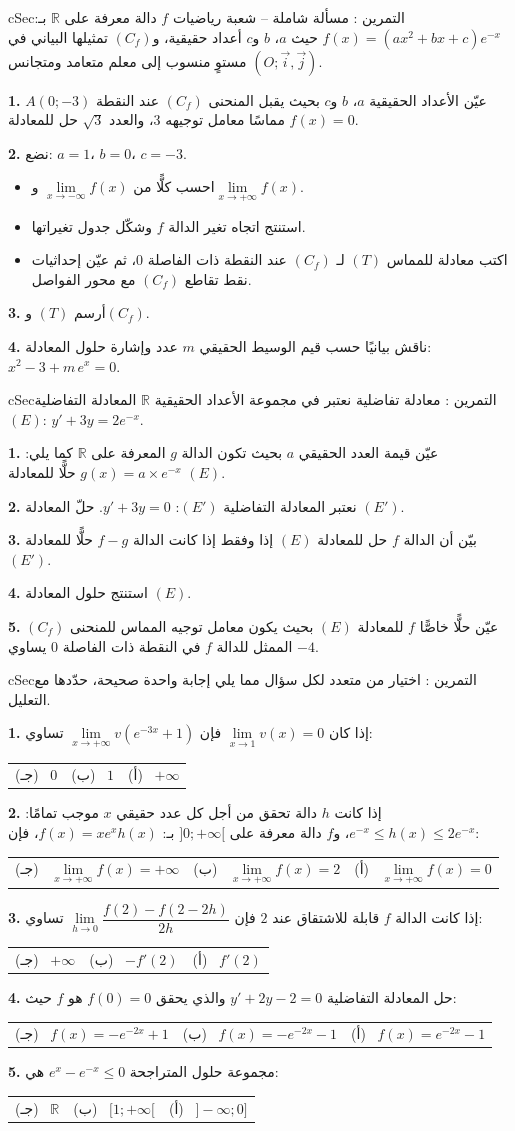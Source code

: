 \documentclass[12pt,a4paper]{article}
\newenvironment{BOX}[2]{\begin{otherlanguage}{english}\begin{arbox}{#1}{#2}}{\end{arbox}\end{otherlanguage}}
\newcounter{exo}
\newenvironment{tamrin}[1]{\stepcounter{exo}\begin{BOX}{cSec}{التمرين \theexo: #1}}{\end{BOX}}
\newcommand{\R}{\mathbb{R}}
\newenvironment{sq}{\begin{itemize}[leftmargin=2.4em,itemsep=3pt]}{\end{itemize}}
\newcommand{\qa}{\item[(أ)]}\newcommand{\qb}{\item[(ب)]}\newcommand{\qc}{\item[(جـ)]}\newcommand{\qd}{\item[(د)]}\newcommand{\qe}{\item[(هـ)]}
\newcommand{\QQ}[1]{\par\smallskip\textbf{#1.} }
\newcommand{\ABC}[3]{\\[2pt]\begin{tabular}{p{0.28\textwidth}p{0.28\textwidth}p{0.28\textwidth}}(جـ) \ #3 & (ب) \ #2 & (أ) \ #1\end{tabular}}
\begin{document}
\begin{tamrin}{مسألة شاملة -- شعبة رياضيات}
$f$ دالة معرفة على $\R$ بـ: $f(x)=\left(ax^2+bx+c\right)e^{-x}$ حيث $a$، $b$ و$c$ أعداد حقيقية، و$(C_f)$ تمثيلها البياني في مستوٍ منسوب إلى معلم متعامد ومتجانس $(O;\vec i,\vec j)$.
\QQ{1} عيّن الأعداد الحقيقية $a$، $b$ و$c$ بحيث يقبل المنحنى $(C_f)$ عند النقطة $A(0;-3)$ مماسًا معامل توجيهه $3$، والعدد $\sqrt3$ حل للمعادلة $f(x)=0$.
\QQ{2} نضع: $a=1$، $b=0$، $c=-3$.
\begin{sq}
\qa احسب كلًّا من $\lim\limits_{x\to-\infty}f(x)$ و$\lim\limits_{x\to+\infty}f(x)$.
\qb استنتج اتجاه تغير الدالة $f$ وشكّل جدول تغيراتها.
\qc اكتب معادلة للمماس $(T)$ لـ $(C_f)$ عند النقطة ذات الفاصلة $0$، ثم عيّن إحداثيات نقط تقاطع $(C_f)$ مع محور الفواصل.
\end{sq}
\QQ{3} أرسم $(T)$ و$(C_f)$.
\QQ{4} ناقش بيانيًا حسب قيم الوسيط الحقيقي $m$ عدد وإشارة حلول المعادلة: $x^2-3+m\,e^{x}=0$.
\end{tamrin}

\begin{tamrin}{معادلة تفاضلية}
نعتبر في مجموعة الأعداد الحقيقية $\R$ المعادلة التفاضلية $(E)$: $y'+3y=2e^{-x}$.
\QQ{1} عيّن قيمة العدد الحقيقي $a$ بحيث تكون الدالة $g$ المعرفة على $\R$ كما يلي: $g(x)=a\times e^{-x}$ حلًّا للمعادلة $(E)$.
\QQ{2} نعتبر المعادلة التفاضلية $(E')$: $y'+3y=0$. حلّ المعادلة $(E')$.
\QQ{3} بيّن أن الدالة $f$ حل للمعادلة $(E)$ إذا وفقط إذا كانت الدالة $f-g$ حلًّا للمعادلة $(E')$.
\QQ{4} استنتج حلول المعادلة $(E)$.
\QQ{5} عيّن حلًّا خاصًّا $f$ للمعادلة $(E)$ بحيث يكون معامل توجيه المماس للمنحنى $(C_f)$ الممثل للدالة $f$ في النقطة ذات الفاصلة $0$ يساوي $-4$.
\end{tamrin}
\begin{tamrin}{اختيار من متعدد}
لكل سؤال مما يلي إجابة واحدة صحيحة، حدّدها مع التعليل.
\QQ{1} إذا كان $\lim\limits_{x\to1}v(x)=0$ فإن $\lim\limits_{x\to+\infty}v\left(e^{-3x}+1\right)$ تساوي:
\ABC{$+\infty$}{$1$}{$0$}
\QQ{2} إذا كانت $h$ دالة تحقق من أجل كل عدد حقيقي $x$ موجب تمامًا: $e^{-x}\leqslant h(x)\leqslant2e^{-x}$، و$f$ دالة معرفة على $]0;+\infty[$ بـ: $f(x)=xe^{x}h(x)$، فإن:
\ABC{$\lim\limits_{x\to+\infty}f(x)=0$}{$\lim\limits_{x\to+\infty}f(x)=2$}{$\lim\limits_{x\to+\infty}f(x)=+\infty$}
\QQ{3} إذا كانت الدالة $f$ قابلة للاشتقاق عند $2$ فإن $\lim\limits_{h\to0}\dfrac{f(2)-f(2-2h)}{2h}$ تساوي:
\ABC{$f'(2)$}{$-f'(2)$}{$+\infty$}
\QQ{4} حل المعادلة التفاضلية $y'+2y-2=0$ والذي يحقق $f(0)=0$ هو $f$ حيث:
\ABC{$f(x)=e^{-2x}-1$}{$f(x)=-e^{-2x}-1$}{$f(x)=-e^{-2x}+1$}
\QQ{5} مجموعة حلول المتراجحة $e^{x}-e^{-x}\leqslant0$ هي:
\ABC{$]{-}\infty;0]$}{$[1;+\infty[$}{$\R$}
\end{tamrin}
\end{document}

